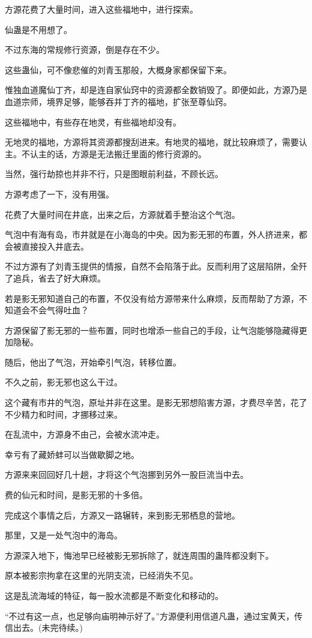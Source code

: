 \begin{this_body}
方源花费了大量时间，进入这些福地中，进行探索。

仙蛊是不用想了。

不过东海的常规修行资源，倒是存在不少。

这些蛊仙，可不像悲催的刘青玉那般，大概身家都保留下来。

惟独血道魔仙丁齐，却是连自家仙窍中的资源都全数销毁了。即便如此，方源乃是血道宗师，境界足够，能够吞并丁齐的福地，扩张至尊仙窍。

这些福地中，有些存在地灵，有些福地却没有。

无地灵的福地，方源将其资源都搜刮进来。有地灵的福地，就比较麻烦了，需要认主。不认主的话，方源是无法搬迁里面的修行资源的。

当然，强行劫掠也并非不行，只是图眼前利益，不顾长远。

方源考虑了一下，没有用强。

花费了大量时间在井底，出来之后，方源就着手整治这个气泡。

气泡中有海有岛，市井就是在小海岛的中央。因为影无邪的布置，外人挤进来，都会被直接投入井底去。

不过方源有了刘青玉提供的情报，自然不会陷落于此。反而利用了这层陷阱，全歼了追兵，省去了好大麻烦。

若是影无邪知道自己的布置，不仅没有给方源带来什么麻烦，反而帮助了方源，不知道会不会气得吐血？

方源保留了影无邪的一些布置，同时也增添一些自己的手段，让气泡能够隐藏得更加隐秘。

随后，他出了气泡，开始牵引气泡，转移位置。

不久之前，影无邪也这么干过。

这个藏有市井的气泡，原址并非在这里。是影无邪想陷害方源，才费尽辛苦，花了不少精力和时间，才挪移过来。

在乱流中，方源身不由己，会被水流冲走。

幸亏有了藏娇蚌可以当做歇脚之地。

方源来来回回好几十趟，才将这个气泡挪到另外一股巨流当中去。

费的仙元和时间，是影无邪的十多倍。

完成这个事情之后，方源又一路辗转，来到影无邪栖息的营地。

那里，又是一处气泡中的海岛。

方源深入地下，悔池早已经被影无邪拆除了，就连周围的蛊阵都没剩下。

原本被影宗拘拿在这里的光阴支流，已经消失不见。

这是乱流海域的特征，每一股水流都是不断变化和移动的。

“不过有这一点，也足够向庙明神示好了。”方源便利用信道凡蛊，通过宝黄天，传信出去。(未完待续。)

\end{this_body}

